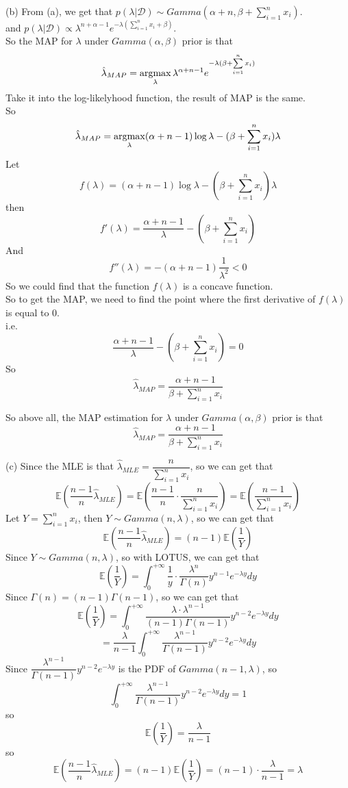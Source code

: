 \documentclass[10pt]{article}
\begin{document}
\begin{enumerate}[1.]
		  (b) From (a), we get that $p(\lambda|\mathcal{D})\sim Gamma(\alpha+n,\beta+\sum\limits_{i=1}^nx_i)$.\\
		  and $p(\lambda|\mathcal{D})\propto\lambda^{n+\alpha-1}e^{-\lambda(\sum\limits_{i=1}^nx_i+\beta)}$.\\
		  So the MAP for $\lambda$ under $Gamma(\alpha,\beta)$ prior is that
		  $$\hat{\lambda}_{MAP}=\mathop{\rm argmax}\limits_{\lambda}\lambda^{\alpha+n-1}e^{-\lambda(\beta+\sum\limits_{i=1}^nx_i)}$$
		  Take it into the log-likelyhood function, the result of MAP is the same.\\
		  So
		  $$\hat{\lambda}_{MAP}=\mathop{\rm argmax}\limits_{\lambda}(\alpha+n-1)\log\lambda-(\beta+\sum\limits_{i=1}^nx_i)\lambda$$
		  Let $$f(\lambda)=(\alpha+n-1)\log\lambda-(\beta+\sum\limits_{i=1}^nx_i)\lambda$$
		  then $$f'(\lambda)=\dfrac{\alpha+n-1}{\lambda}-(\beta+\sum\limits_{i=1}^nx_i)$$
		  And $$f''(\lambda)=-(\alpha+n-1)\dfrac{1}{\lambda^2}<0$$
		  So we could find that the function $f(\lambda)$ is a concave function.\\
		  So to get the MAP, we need to find the point where the first derivative of $f(\lambda)$ is equal to 0.\\
		  i.e. $$\dfrac{\alpha+n-1}{\lambda}-(\beta+\sum\limits_{i=1}^nx_i)=0$$
		  So $$\hat{\lambda}_{MAP}=\dfrac{\alpha+n-1}{\beta+\sum\limits_{i=1}^nx_i}$$

		  So above all, the MAP estimation for $\lambda$ under $Gamma(\alpha,\beta)$ prior is that
		  $$\hat{\lambda}_{MAP}=\dfrac{\alpha+n-1}{\beta+\sum\limits_{i=1}^nx_i}$$

		  (c) Since the MLE is that $\hat{\lambda}_{MLE}=\dfrac{n}{\sum\limits_{i=1}^nx_i}$, so we can get that
		  $$\mathbb{E}(\dfrac{n-1}{n}\hat{\lambda}_{MLE})=\mathbb{E}(\dfrac{n-1}{n}\cdot\dfrac{n}{\sum\limits_{i=1}^nx_i})=\mathbb{E}(\dfrac{n-1}{\sum\limits_{i=1}^nx_i})$$
		  Let $Y=\sum\limits_{i=1}^nx_i$, then $Y\sim Gamma(n,\lambda)$, so we can get that
		  $$\mathbb{E}(\dfrac{n-1}{n}\hat{\lambda}_{MLE})=(n-1)\mathbb{E}(\dfrac{1}{Y})$$
		  Since $Y\sim Gamma(n,\lambda)$, so with LOTUS, we can get that
		  $$\mathbb{E}(\dfrac{1}{Y})=\int_{0}^{+\infty}\dfrac{1}{y}\cdot\dfrac{\lambda^n}{\Gamma(n)}y^{n-1}e^{-\lambda y}dy$$
		  Since $\Gamma(n)=(n-1)\Gamma(n-1)$, so we can get that
		  $$\mathbb{E}(\dfrac{1}{Y})=\int_{0}^{+\infty}\dfrac{\lambda\cdot\lambda^{n-1}}{(n-1)\Gamma(n-1)}y^{n-2}e^{-\lambda y}dy$$
		  $$=\dfrac{\lambda}{n-1}\int_{0}^{+\infty}\dfrac{\lambda^{n-1}}{\Gamma(n-1)}y^{n-2}e^{-\lambda y}dy$$
      	  Since $\dfrac{\lambda^{n-1}}{\Gamma(n-1)}y^{n-2}e^{-\lambda y}$ is the PDF of $Gamma(n-1,\lambda)$,
		  so $$\int_{0}^{+\infty}\dfrac{\lambda^{n-1}}{\Gamma(n-1)}y^{n-2}e^{-\lambda y}dy=1$$
		  so $$\mathbb{E}(\dfrac{1}{Y})=\dfrac{\lambda}{n-1}$$
		  so $$\mathbb{E}(\dfrac{n-1}{n}\hat{\lambda}_{MLE})=(n-1)\mathbb{E}(\dfrac{1}{Y})=(n-1)\cdot\dfrac{\lambda}{n-1}=\lambda$$


\end{enumerate}
\end{document}
